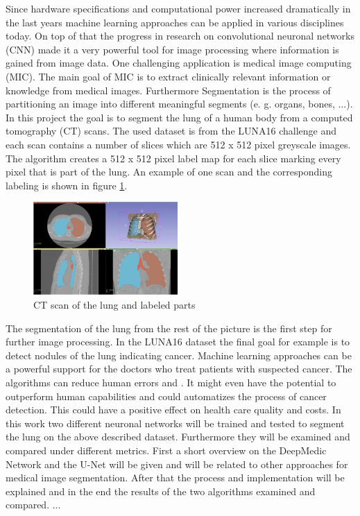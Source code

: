 
Since hardware specifications and computational power increased dramatically in the last years machine learning approaches can be applied in various disciplines today. On top of that the progress in research on convolutional neuronal networks (CNN) made it a very powerful tool for image processing where information is gained from image data.\newline
One challenging application is medical image computing (MIC). The main goal of MIC is to extract clinically relevant information or knowledge from medical images. Furthermore Segmentation is the process of partitioning an image into different meaningful segments (e. g. organs, bones, ...).\newline
In this project the goal is to segment the lung of a human body from a computed tomography (CT) scans.\newline
The used dataset is from the LUNA16 challenge \cite{luna} and each scan contains a number of slices which are 512 x 512 pixel greyscale images. The algorithm creates a 512 x 512 pixel label map for each slice marking every pixel that is part of the lung. An example of one scan and the corresponding labeling is shown in figure \ref{scan_picture}.

\begin{figure}[h!]
	\includegraphics[width=0.49\textwidth, angle=0]{files/scan_picture.jpg}
	\caption{CT scan of the lung and labeled parts}
	\label{scan_picture}
\end{figure}

The segmentation of the lung from the rest of the picture is the first step for further image processing. In the LUNA16 dataset the final goal for example is to detect nodules of the lung indicating cancer. Machine learning approaches can be a powerful support for the doctors who treat patients with suspected cancer. The algorithms can reduce human errors and . It might even have the potential to outperform human capabilities and could automatizes the process of cancer detection. This could have a positive effect on health care quality and costs.\newline
In this work two different neuronal networks will be trained and tested to segment the lung on the above described dataset. Furthermore they will be examined and compared under different metrics.\newline
First a short overview on the DeepMedic Network and the U-Net will be given and will be related to other approaches for medical image segmentation. After that the process and implementation will be explained and in the end the results of the two algorithms examined and compared.
... 
